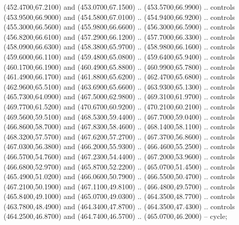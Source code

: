 {\begin{scope}[y=0.80pt, x=0.80pt, yscale=-1, xscale=1, inner sep=0pt, outer sep=0pt, #1]
      (452.4700,67.2100) and (453.0700,67.1500) .. (453.5700,66.9900) .. controls
      (453.9500,66.9000) and (454.5800,67.0100) .. (454.9400,66.9200) .. controls
      (455.3000,66.5600) and (455.9800,66.6600) .. (456.3000,66.5900) .. controls
      (456.8200,66.6100) and (457.2900,66.1200) .. (457.7000,66.3300) .. controls
      (458.0900,66.6300) and (458.3800,65.9700) .. (458.9800,66.1600) .. controls
      (459.6000,66.1100) and (459.4800,65.0800) .. (459.6400,65.9400) .. controls
      (460.1700,66.1900) and (460.4900,65.8800) .. (460.9900,65.7800) .. controls
      (461.4900,66.1700) and (461.8800,65.6200) .. (462.4700,65.6800) .. controls
      (462.9600,65.5100) and (463.6900,65.6600) .. (463.9300,65.1300) .. controls
      (465.7300,64.0900) and (467.5000,62.9800) .. (469.3100,61.9700) .. controls
      (469.7700,61.5200) and (470.6700,60.9200) .. (470.2100,60.2100) .. controls
      (469.5600,59.5100) and (468.5300,59.4400) .. (467.7000,59.0400) .. controls
      (466.8600,58.7000) and (467.8300,58.4600) .. (468.1400,58.1100) .. controls
      (468.3200,57.5700) and (467.6200,57.2700) .. (467.3700,56.8600) .. controls
      (467.0300,56.3800) and (466.2000,55.9300) .. (466.4600,55.2500) .. controls
      (466.5700,54.7600) and (467.2300,54.4400) .. (467.2000,53.9600) .. controls
      (466.6800,52.9700) and (465.8700,52.2200) .. (465.0700,51.4500) .. controls
      (465.4900,51.0200) and (466.0600,50.7900) .. (466.5500,50.4700) .. controls
      (467.2100,50.1900) and (467.1100,49.8100) .. (466.4800,49.5700) .. controls
      (465.8400,49.1000) and (465.0700,49.0300) .. (464.3500,48.7700) .. controls
      (463.7800,48.4900) and (464.3400,47.8700) .. (464.3500,47.4300) .. controls
      (464.2500,46.8700) and (464.7400,46.5700) .. (465.0700,46.2000) -- cycle;


\end{scope}}
